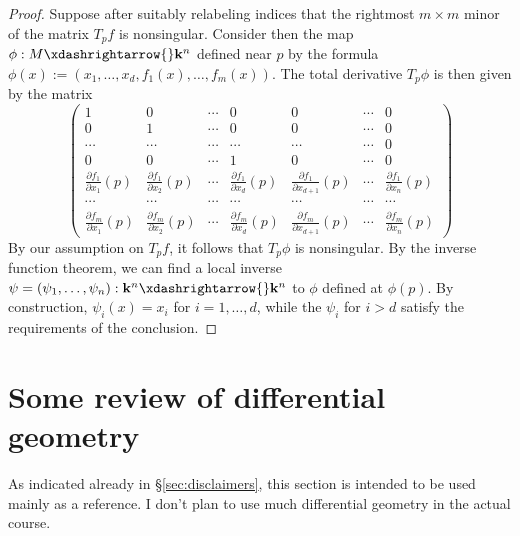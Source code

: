 \documentclass[reqno]{amsart} 
\begin{document}
\begin{proof}
  Suppose after suitably relabeling indices that the rightmost
  $m \times m$ minor of the matrix $T_p f$ is nonsingular.
  Consider then the map
  $\phi : M \xdashrightarrow{} \mathbf{k}^n$ defined near $p$ by
  the formula
  $\phi(x) := (x_1,\dotsc,x_d,f_1(x),\dotsc,f_m(x))$.  The total
  derivative $T_p \phi$ is then given by the matrix
  \begin{equation*}
  \begin{pmatrix}
    1 & 0 & \dotsb & 0 & 0 & \dotsb & 0 \\
    0 & 1 & \dotsb & 0 & 0 & \dotsb & 0 \\
    \dotsb & \dotsb & \dotsb & \dotsb & \dotsb & \dotsb & 0 \\
    0 & 0 & \dotsb & 1 & 0 & \dotsb & 0 \\
    \frac{\partial f_1}{\partial x_{1}}(p)  &   \frac{\partial f_1}{\partial x_{2}}(p) & \dotsb & \frac{\partial f_1}{\partial x_d}(p) & \frac{\partial f_1}{\partial x_{d+1}}(p) & \dotsb & \frac{\partial f_1}{\partial x_{n}}(p) \\
    \dotsb & \dotsb & \dotsb & \dotsb & \dotsb & \dotsb & \dotsb \\
    \frac{\partial f_m}{\partial x_{1}}(p)  &   \frac{\partial f_m}{\partial x_{2}}(p) & \dotsb & \frac{\partial f_m}{\partial x_d}(p) & \frac{\partial f_m}{\partial x_{d+1}}(p) & \dotsb & \frac{\partial f_m}{\partial x_{n}}(p) 
  \end{pmatrix}
  \end{equation*}
  By our assumption on $T_p f$, it follows that $T_p \phi$ is
  nonsingular.  By the inverse function theorem, we can find a
  local inverse
  $\psi = (\psi_1,\dotsc,\psi_n) : \mathbf{k}^n \xdashrightarrow{}
  \mathbf{k}^n$
  to $\phi$ defined at $\phi(p)$.
  By construction,
  $\psi_i(x) = x_i$ for $i=1,\dotsc,d$,
  while the $\psi_i$ for $i > d$
  satisfy the requirements of the conclusion.
\end{proof}

\section{Some review of differential geometry}
\label{sec:org53eb85b}
As indicated already in \S\ref{sec:disclaimers}, this section is
intended to be used mainly as a reference.  I don't plan to use much
differential geometry in the actual course.
\end{document}
